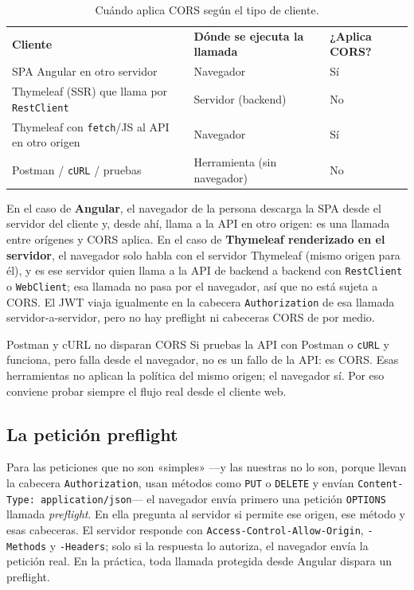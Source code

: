 \documentclass[11pt]{article}
\begin{document}
\begin{table}[h]
\centering
\caption{Cuándo aplica CORS según el tipo de cliente.}
\label{tab:cors}
\renewcommand{\arraystretch}{1.25}
\begin{tabular}{p{6.0cm} p{4.2cm} >{\centering\arraybackslash}p{2.4cm}}
\rowcolor{jwebazul!12}
\textbf{Cliente} & \textbf{Dónde se ejecuta la llamada} & \textbf{¿Aplica CORS?} \\
SPA Angular en otro servidor & Navegador & Sí \\
Thymeleaf (SSR) que llama por \texttt{RestClient} & Servidor (backend) & No \\
Thymeleaf con \texttt{fetch}/JS al API en otro origen & Navegador & Sí \\
Postman / \texttt{cURL} / pruebas & Herramienta (sin navegador) & No \\
\end{tabular}
\end{table}

En el caso de \textbf{Angular}, el navegador de la persona descarga la SPA desde el servidor del cliente y, desde ahí, llama a la API en otro origen: es una llamada entre orígenes y CORS aplica. En el caso de \textbf{Thymeleaf renderizado en el servidor}, el navegador solo habla con el servidor Thymeleaf (mismo origen para él), y es ese servidor quien llama a la API de backend a backend con \texttt{RestClient} o \texttt{WebClient}; esa llamada no pasa por el navegador, así que no está sujeta a CORS. El JWT viaja igualmente en la cabecera \texttt{Authorization} de esa llamada servidor-a-servidor, pero no hay preflight ni cabeceras CORS de por medio.

\begin{cajatip}{Postman y cURL no disparan CORS}
Si pruebas la API con Postman o \texttt{cURL} y funciona, pero falla desde el navegador, no es un fallo de la API: es CORS. Esas herramientas no aplican la política del mismo origen; el navegador sí. Por eso conviene probar siempre el flujo real desde el cliente web.\par
\end{cajatip}

\subsection{La petición preflight}
Para las peticiones que no son «simples» ---y las nuestras no lo son, porque llevan la cabecera \texttt{Authorization}, usan métodos como \texttt{PUT} o \texttt{DELETE} y envían \texttt{Content-Type:\allowbreak{} application/json}--- el navegador envía primero una petición \texttt{OPTIONS} llamada \emph{preflight}. En ella pregunta al servidor si permite ese origen, ese método y esas cabeceras. El servidor responde con \texttt{Access-Control-Allow-Origin}, \texttt{-Methods} y \texttt{-Headers}; solo si la respuesta lo autoriza, el navegador envía la petición real. En la práctica, toda llamada protegida desde Angular dispara un preflight.
\end{document}
